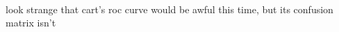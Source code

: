 \documentclass[11pt]{article}
\begin{document}
    \begin{center}
    \end{center}
    { \hspace*{\fill} \\}
    
    look strange that cart's roc curve would be awful this time, but its
confusion matrix isn't


    
    
    
    
\end{document}
